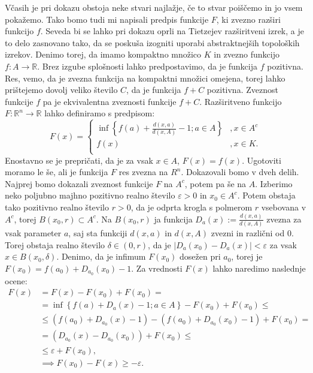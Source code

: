 \documentclass[mat1]{fmfdelo}
\newcommand{\R}{\mathbb R}
\newcommand{\0}{\underline{0}}
\begin{document}
\begin{dokaz}
Včasih je pri dokazu obstoja neke stvari najlažje, če to stvar poiščemo in jo vsem pokažemo. Tako bomo tudi mi napisali predpis funkcije $F$, ki zvezno razširi funkcijo $f$. Seveda bi se lahko pri dokazu oprli na Tietzejev razširitveni izrek, a je to delo zasnovano tako, da se poskuša izogniti uporabi abstraktnejših topoloških izrekov. Denimo torej, da imamo kompaktno množico $K$ in zvezno funkcijo \mbox{$f : A \to \R$}. Brez izgube splošnosti lahko predpostavimo, da je funkcija $f$ pozitivna. Res, vemo, da je zvezna funkcija na kompaktni množici omejena, torej lahko prištejemo dovolj veliko število $C$, da je funkcija $f + C$ pozitivna. Zveznost funkcije $f$ pa je ekvivalentna zveznosti funkcije $f + C$.
Razširitveno funkcijo \mbox{$F : \R^n \to \R$} lahko definiramo s predpisom:
\[  F(x) = \left \{
\begin{array}{ll}
	\inf \left \{ f(a) + \frac{d(x, a)}{d(x, A)} - 1; a \in A \right \} &, x \in A^c \\
	f(x) &, x \in K. \\
\end{array} 
\right. \]
Enostavno se je prepričati, da je za vsak $x \in A$, $F(x) = f(x)$. Ugotoviti moramo le še, ali je funkcija $F$ res zvezna na $R^n$.
Dokazovali bomo v dveh delih. Najprej bomo dokazali zveznost funkcije $F$ na $A^c$, potem pa še na $A$.
Izberimo neko poljubno majhno pozitivno realno število $\varepsilon > 0$ in $x_0 \in A^c$. Potem obstaja tako pozitivno realno število $r>0$, da je odprta krogla s polmerom $r$ vsebovana v $A^c$, torej $B(x_0, r) \subset A^c$. Na $B(x_0, r)$ ja funkcija $D_a(x) := \frac{d(x, a)}{d(x, A)}$ zvezna za vsak parameter $a$, saj sta funkciji $d(x, a)$ in $d(x, A)$ zvezni in različni od $0$. Torej obstaja realno število $\delta \in (0, r)$, da je $|D_a(x_0) - D_a(x)| < \varepsilon$ za vsak $x \in B(x_0, \delta)$.
Denimo, da je infimum $F(x_0)$ dosežen pri $a_0$, torej je $F(x_0) = f(a_0) + D_{a_0}(x_0) - 1$. Za vrednosti $F(x)$ lahko naredimo naslednje ocene:
\begin{equation*} \label{eq1}
\begin{split}
F(x) & = F(x) - F(x_0) + F(x_0) = \\
& = \inf \left \{ f(a) + D_a(x) - 1; a \in A \right \} - F(x_0) + F(x_0) \leq \\
& \leq (f(a_0) + D_{a_0}(x) - 1) -  (f(a_0) + D_{a_0}(x_0) - 1) + F(x_0) = \\
& = (D_{a_0}(x) -  D_{a_0}(x_0)) + F(x_0) \leq \\
& \leq \varepsilon + F(x_0), \\
& \implies F(x_0) - F(x) \geq -\varepsilon.
\end{split}
\end{equation*}


\end{dokaz}
\end{document}
